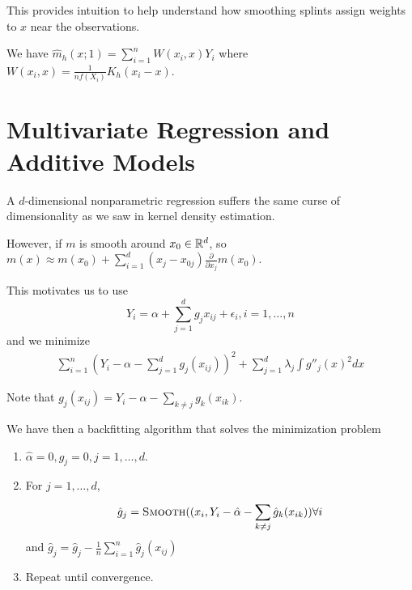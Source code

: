 This provides intuition to help understand how smoothing splints
assign weights to $x$ near the observations.

We have $\hat m_{h}(x; 1) = \sum_{i=1}^{n} W(x_{i}, x) Y_{i}$ where
$W(x_{i}, x) = \frac{1}{nf(X_{i})} K_{h}(x_{i} - x)$.

\section{Multivariate Regression and Additive Models}
\label{sec:mult-regr-addit}

A $d$-dimensional nonparametric regression suffers the same curse of
dimensionality as we saw in kernel density estimation.

However, if $m$ is smooth around $x_{0} \in \mathbb{R}^{d}$, so $m(x) \approx
m(x_{0}) + \sum_{i=1}^{d} (x_{j} - x_{0j}) \frac{\partial}{\partial
  x_{j}} m(x_{0})$.

This motivates us to use
\begin{equation}
  \label{eq:89}
  Y_{i} = \alpha + \sum_{j=1}^{d} g_{j} x_{ij} + \epsilon_{i}, i = 1,
  \dots, n
\end{equation} and we minimize
\begin{align}
  \label{eq:91}
  \sum_{i=1}^{n} (Y_{i} - \alpha - \sum_{j=1}^{d} g_{j}(x_{ij}))^{2} +
  \sum_{j=1}^{d} \lambda_{j} \int g''_{j}(x)^{2} dx
\end{align}

Note that $g_{j}(x_{ij}) = Y_i - \alpha - \sum_{k \neq j}^{}
g_{k}(x_{ik})$.

We have then a backfitting algorithm that solves the minimization problem
\begin{enumerate}
\item $\hat \alpha = 0, \hat g_{j} = 0, j = 1, \dots, d$.
\item For $j = 1, \dots, d$,
  \begin{equation}
    \label{eq:92}
    \hat g_{j} = \textsc{Smooth} ((x_{i}, Y_{i} - \hat \alpha  - \sum_{k \neq
      j}^{} \hat g_{k}(x_{ik})) \forall i
  \end{equation}
  and $\hat g_{j} = \hat g_{j} - \frac{1}{n} \sum_{i=1}^{n} \hat g_{j}(x_{ij})$
\item Repeat until convergence.
\end{enumerate}

